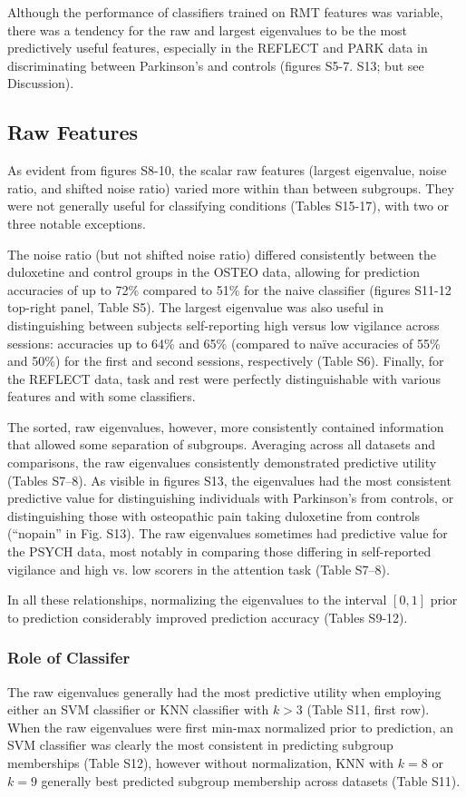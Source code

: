 \documentclass[10pt]{article}
\begin{document}
Although the performance of classifiers trained on RMT features was variable, there was a tendency
for the raw and largest eigenvalues to be the most predictively useful features, especially in the
REFLECT and PARK data in discriminating between Parkinson's and controls (figures S5-7. S13; but see
Discussion).

\subsection{Raw Features}
As evident from figures S8-10, the scalar raw features (largest eigenvalue, noise ratio, and shifted
noise ratio) varied more within than between subgroups. They were not generally useful for
classifying conditions (Tables S15-17), with two or three notable exceptions.

The noise ratio (but not shifted noise ratio) differed consistently between the duloxetine and
control groups in the OSTEO data, allowing for prediction accuracies of up to 72\% compared to 51\%
for the naive classifier (figures S11-12 top-right panel, Table S5). The largest eigenvalue was also
useful in distinguishing between subjects self-reporting high versus low vigilance across sessions:
accuracies up to 64\% and 65\% (compared to naïve accuracies of 55\% and 50\%) for the first and
second sessions, respectively (Table S6). Finally, for the REFLECT data, task and rest were
perfectly distinguishable with various features and with some classifiers.

The sorted, raw eigenvalues, however, more consistently contained information that allowed some
separation of subgroups. Averaging across all datasets and comparisons, the raw eigenvalues
consistently demonstrated predictive utility (Tables S7--8). As visible in figures S13, the eigenvalues
had the most consistent predictive value for distinguishing individuals with Parkinson's from
controls, or distinguishing those with osteopathic pain taking duloxetine from controls (``nopain'' in
Fig. S13). The raw eigenvalues sometimes had predictive value for the PSYCH data, most notably in
comparing those differing in self-reported vigilance and high vs. low scorers in the attention task
(Table S7--8).

In all these relationships, normalizing the eigenvalues to the interval \([0,1]\) prior to
prediction considerably improved prediction accuracy (Tables S9-12).

\subsubsection{Role of Classifer}
The raw eigenvalues generally had the most predictive utility when employing either an SVM
classifier or KNN classifier with \(k > 3\) (Table S11, first row). When the raw eigenvalues were
first min-max normalized prior to prediction, an SVM classifier was clearly the most consistent in
predicting subgroup memberships (Table S12), however without normalization, KNN with \(k = 8\) or
\(k = 9\) generally best predicted subgroup membership across datasets (Table S11).
\end{document}
